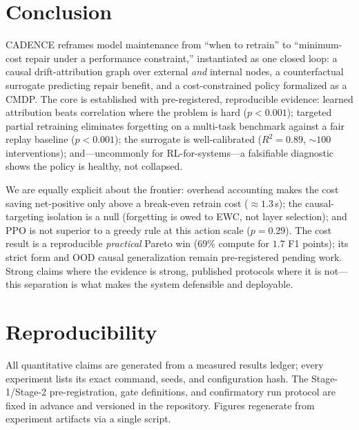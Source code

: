\documentclass[conference]{IEEEtran}
\begin{document}
\section{Conclusion}\label{sec:conclusion}
CADENCE reframes model maintenance from ``when to retrain'' to
``minimum-cost repair under a performance constraint,'' instantiated as
one closed loop: a causal drift-attribution graph over external
\emph{and} internal nodes, a counterfactual surrogate predicting repair
benefit, and a cost-constrained policy formalized as a CMDP. The core is
established with pre-registered, reproducible evidence: learned
attribution beats correlation where the problem is hard ($p<0.001$);
targeted partial retraining eliminates forgetting on a multi-task
benchmark against a fair replay baseline ($p<0.001$); the surrogate is
well-calibrated ($R^2=0.89$, $\sim\!100$ interventions); and---uncommonly
for RL-for-systems---a falsifiable diagnostic shows the policy is
healthy, not collapsed.

We are equally explicit about the frontier: overhead accounting makes the
cost saving net-positive only above a break-even retrain cost
($\approx1.3$\,s); the causal-targeting isolation is a null (forgetting is
owed to EWC, not layer selection); and PPO is not superior to a greedy
rule at this action scale ($p=0.29$). The cost result is a reproducible
\emph{practical} Pareto win ($69\%$ compute for $1.7$ F1 points); its
strict form and OOD causal generalization remain pre-registered pending
work. Strong claims where the evidence is strong, published protocols
where it is not---this separation is what makes the system defensible and
deployable.

\section*{Reproducibility}
All quantitative claims are generated from a measured results ledger;
every experiment lists its exact command, seeds, and configuration hash.
The Stage-1/Stage-2 pre-registration, gate definitions, and confirmatory
run protocol are fixed in advance and versioned in the repository.
Figures regenerate from experiment artifacts via a single script.



\end{document}
